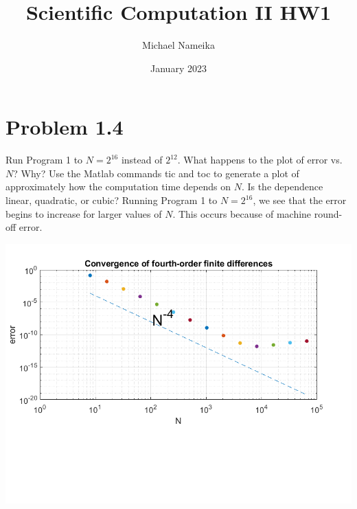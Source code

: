 \documentclass{article}
\title{Scientific Computation II HW1}
\author{Michael Nameika}
\date{January 2023}
\begin{document}
\maketitle

\section*{Problem 1.4}

Run Program 1 to $N = 2^{16}$ instead of $2^{12}$. What happens to the plot of error vs. $N$? Why? Use the Matlab commands tic and toc to generate a plot of approximately how the computation time depends on $N$. Is the dependence linear, quadratic, or cubic?
\newline\newline
Running Program 1 to $N=2^{16}$, we see that the error begins to increase for larger values of $N$. This occurs because of machine round-off error.
\newline
\begin{center}
\includegraphics[scale = 0.5]{problem 1 plot 1 sci comp.png}
\end{center}
\end{document}
